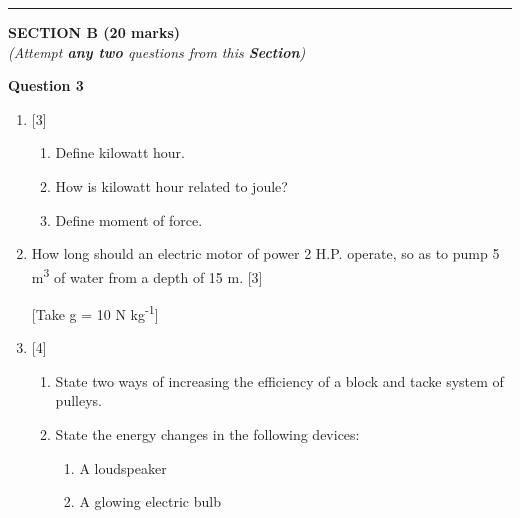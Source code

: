 \par\noindent\rule{\textwidth}{0.4pt}
\begin{center}
   \large
   \textbf{SECTION B (20 marks)}\\
   \vspace{5mm}
   \normalsize
   \textit{(Attempt \textbf{any two} questions from this \textbf{Section})}
\end{center}
\par

\noindent
\textbf{Question 3}
\begin{enumerate}[label=(\roman*)]

    \item \hfill [3]
        \begin{enumerate}[label=(\alph*)]
            \item Define kilowatt hour.
            \item How is kilowatt hour related to joule?
            \item Define moment of force. 
        \end{enumerate}

    \item How long should an electric motor of power 2 H.P. operate, so 
        as to pump 5 m\textsuperscript{3} of water from a depth of 
        15 m. \hfill [3]

        [Take g = 10 N kg\textsuperscript{-1}]

    \item \hfill [4]
        \begin{enumerate}[label=(\alph*)]
            \item State two ways of increasing the efficiency of a block 
                and tacke system of pulleys.
            \item State the energy changes in the following devices:
                \begin{enumerate}
                    \setlength\itemsep{0em}
                    \item A loudspeaker
                    \item A glowing electric bulb
                \end{enumerate}
        \end{enumerate}

\end{enumerate}

